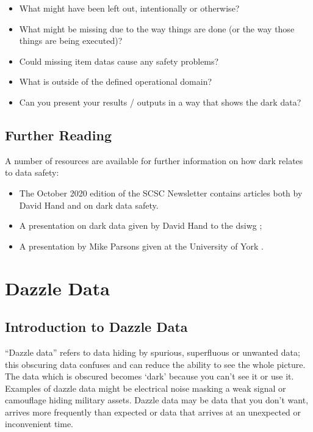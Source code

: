 \begin{itemize}
  \item What might have been left out, intentionally or otherwise?
  \item What might be missing due to the way things are done (or the way those things are being executed)?
  \item Could missing \glspl{item data} cause any safety problems?
  \item What is outside of the defined operational domain?
  \item Can you present your results / outputs in a way that shows the dark data?
\end{itemize}

\subsection{Further Reading}
A number of resources are available for further \gls{information} on how dark relates to data safety:
\begin{itemize}
\item The October 2020 edition of the SCSC Newsletter \cite{citation:SCSC160} contains articles both by David Hand and on dark data safety.
  \item A presentation on dark data given by David Hand to the \gls{dsiwg} \cite{citation:darkdata:presentation1};
  \item A presentation by Mike Parsons given at the University of York \cite{citation:darkdata:presentation2}.
\end{itemize}
%
%
%
%
\section{Dazzle Data}\label{bkm:dazzledata}
%



\subsection{Introduction to Dazzle Data}
``Dazzle data'' refers to data hiding by spurious, superfluous or unwanted data; this obscuring data confuses and can reduce the ability to see the whole picture. The data which is obscured becomes `dark' because you can't see it or use it. Examples of dazzle data might be electrical noise masking a weak signal or camouflage hiding military assets. Dazzle data may be data that you don’t want, arrives more frequently than expected or data that arrives at an unexpected or inconvenient time.



